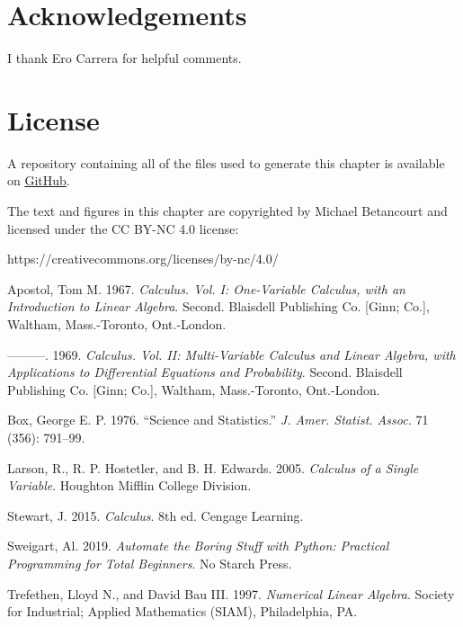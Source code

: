 \documentclass[
  letterpaper,
  DIV=11,
  numbers=noendperiod]{scrartcl}
\newlength{\cslhangindent}
\newlength{\cslentryspacingunit} %
\newenvironment{CSLReferences}[2] %
 {%
  \setlength{\parindent}{0pt}
  \ifodd #1
  \let\oldpar\par
  \def\par{\hangindent=\cslhangindent\oldpar}
  \fi
  \setlength{\parskip}{#2\cslentryspacingunit}
 }%
 {}
\begin{document}
\hypertarget{acknowledgements}{%
\section{Acknowledgements}\label{acknowledgements}}

I thank Ero Carrera for helpful comments.

\hypertarget{license}{%
\section*{License}\label{license}}

A repository containing all of the files used to generate this chapter
is available on
\href{https://github.com/betanalpha/quarto_chapters/tree/main/preface}{GitHub}.

The text and figures in this chapter are copyrighted by Michael
Betancourt and licensed under the CC BY-NC 4.0 license:

https://creativecommons.org/licenses/by-nc/4.0/

\hypertarget{refs}{}
\begin{CSLReferences}{1}{0}
\leavevmode{}%
Apostol, Tom M. 1967. \emph{Calculus. {V}ol. {I}: {O}ne-Variable
Calculus, with an Introduction to Linear Algebra}. Second. Blaisdell
Publishing Co. {[}Ginn; Co.{]}, Waltham, Mass.-Toronto, Ont.-London.

\leavevmode{}%
---------. 1969. \emph{Calculus. {V}ol. {II}: {M}ulti-Variable Calculus
and Linear Algebra, with Applications to Differential Equations and
Probability}. Second. Blaisdell Publishing Co. {[}Ginn; Co.{]}, Waltham,
Mass.-Toronto, Ont.-London.

\leavevmode{}%
Box, George E. P. 1976. {``Science and Statistics.''} \emph{J. Amer.
Statist. Assoc.} 71 (356): 791--99.

\leavevmode{}%
Larson, R., R. P. Hostetler, and B. H. Edwards. 2005. \emph{Calculus of
a Single Variable}. Houghton Mifflin College Division.

\leavevmode{}%
Stewart, J. 2015. \emph{Calculus}. 8th ed. Cengage Learning.

\leavevmode{}%
Sweigart, Al. 2019. \emph{Automate the Boring Stuff with Python:
Practical Programming for Total Beginners}. No Starch Press.

\leavevmode{}%
Trefethen, Lloyd N., and David Bau III. 1997. \emph{Numerical Linear
Algebra}. Society for Industrial; Applied Mathematics (SIAM),
Philadelphia, PA.

\end{CSLReferences}
\end{document}
